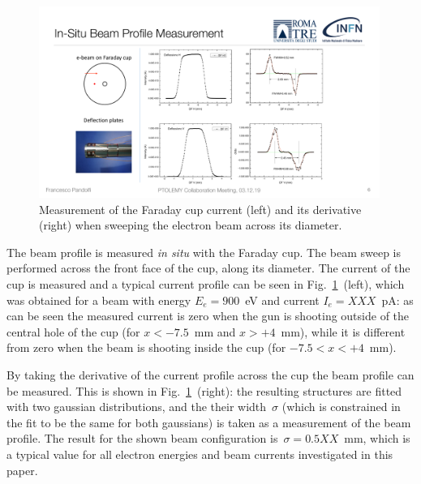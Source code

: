 \documentclass[12p]{paper}
\begin{document}
\begin{figure}[tb]
  \centering
\includegraphics[width=0.99\textwidth]{figures/FC_scan.pdf}
 \caption{Measurement of the Faraday cup current (left) and its derivative (right) when sweeping the electron beam across its diameter.
  \label{fig:FC_scan}}
\end{figure}


The beam profile is measured {\em in situ} with the Faraday cup. The beam sweep is performed across the front face of the cup, along its diameter. The current of the cup is measured and a typical current profile can be seen in Fig.~\ref{fig:FC_scan}~(left), which was obtained for a beam with energy $E_e = 900$~eV and current $I_e = XXX$~pA: as can be seen the measured current is zero when the gun is shooting outside of the central hole of the cup (for $x < -7.5$~mm and $x > +4$~mm), while it is different from zero when the beam is shooting inside the cup (for $-7.5 < x < +4$~mm). 

By taking the derivative of the current profile across the cup the beam profile can be measured. This is shown in Fig.~\ref{fig:FC_scan}~(right): the resulting structures are fitted with two gaussian distributions, and the their width~$\sigma$ (which is constrained in the fit to be the same for both gaussians) is taken as a measurement of the beam profile. The result for the shown beam configuration is~$\sigma = 0.5XX$~mm, which is a typical value for all electron energies and beam currents investigated in this paper.  
\end{document}
